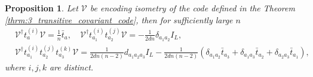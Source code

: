 \documentclass[11pt,letterpaper]{article}
\theoremstyle{plain}
\theoremstyle{plain}
\theoremstyle{plain}
\theoremstyle{plain}
\theoremstyle{plain}
\theoremstyle{plain}
\theoremstyle{plain}
\newtheorem{smproposition}[smtheorem]{Proposition}
\theoremstyle{definition}
\theoremstyle{plain}
\begin{document}
\begin{smproposition}\label{prop:1_2_and_3_body_action}
    Let $\mathcal{V}$ be encoding isometry of the code defined in the Theorem \ref{thrm:3_transitive_covariant_code}, then for sufficiently large $n$
    \begin{align}
    &\mathcal{V}^{\dagger} t^{(i)}_a \mathcal{V}=\frac{1}{n} \bar{t}_a, \quad \mathcal{V}^{\dagger} t_{a_1}^{(i)} t_{a_2}^{(j)} \mathcal{V}=-\frac{1}{2 d n} \delta_{a_1 a_2} I_L, \\ &\mathcal{V}^{\dagger} t_{a_1}^{(i)} t_{a_2}^{(j)} t_{a_3}^{(k)} \mathcal{V}
    =\frac{1}{2 dn(n-2)} d_{a_1 a_2 a_3} I_L-\frac{1}{2 dn(n-2)}\left(\delta_{a_1 a_2} \bar{t}_{a_3}+\delta_{a_1 a_3} \bar{t}_{a_2}+\delta_{a_2 a_3} \bar{t}_{a_1}\right),
    \end{align}
    where $i, j, k$ are distinct.
\end{smproposition}
\end{document}

